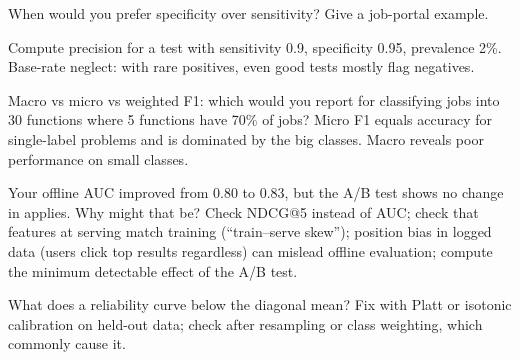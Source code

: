 \begin{qa}{When would you prefer specificity over sensitivity? Give a job-portal example.}
\end{qa}

\begin{qa}{Compute precision for a test with sensitivity 0.9, specificity 0.95, prevalence 2\%.}
\why Base-rate neglect: with rare positives, even good tests mostly flag negatives.
\end{qa}

\begin{qa}{Macro vs micro vs weighted F1: which would you report for classifying jobs into 30 functions where 5 functions have 70\% of
jobs?}
\why Micro F1 equals accuracy for single-label problems and is dominated by the big classes. Macro reveals poor performance on small classes.
\end{qa}

\begin{qa}{\deep Your offline AUC improved from 0.80 to 0.83, but the A/B test shows no change in applies. Why might that be?}
\why Check NDCG@5 instead of AUC; check that features at serving match training (``train--serve skew''); position bias in logged data
(users click top results regardless) can mislead offline evaluation; compute the minimum detectable effect of the A/B test.
\end{qa}

\begin{qa}{What does a reliability curve below the diagonal mean?}
\why Fix with Platt or isotonic calibration on held-out data; check after resampling or class weighting, which commonly cause it.
\end{qa}

